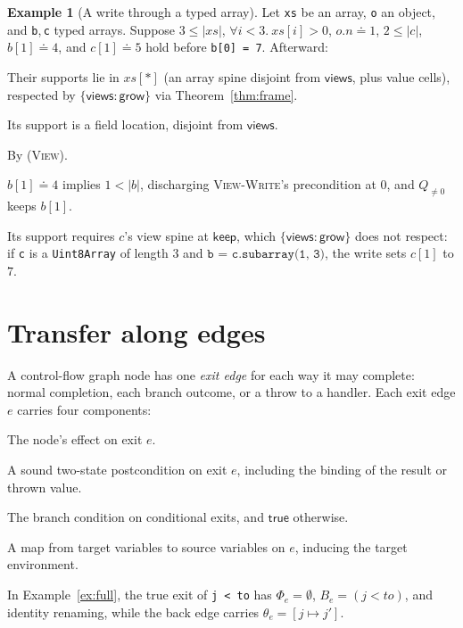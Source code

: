 \documentclass[10pt,a4paper]{article}
\theoremstyle{definition}
\newtheorem{example}[theorem]{Example}
\theoremstyle{remark}
\newcommand{\kw}[1]{\mathsf{#1}}
\newcommand{\keep}{\kw{keep}}
\newcommand{\grow}{\kw{grow}}
\newcommand{\vw}{\kw{views}}
\newcommand{\len}[1]{|#1|}
\newcommand{\code}[1]{\texttt{#1}}
\begin{document}
\begin{example}[A write through a typed array]\label{ex:view}
Let \code{xs} be an array, \code{o} an object, and \code{b},\,\code{c}
typed arrays. Suppose $3\le\len{\mathit{xs}}$,
$\forall i<3.\ \mathit{xs}[i]>0$, $o.n\doteq 1$, $2\le\len c$,
$b[1]\doteq 4$, and $c[1]\doteq 5$ hold before \code{b[0] = 7}. Afterward:
\begin{description}[leftmargin=1.5em,style=nextline]
\item[{$3\le\len{\mathit{xs}}$ and $\forall i<3.\ \mathit{xs}[i]>0$ hold}]
Their supports lie in $\mathit{xs}[\ast]$ (an array spine disjoint from
$\vw$, plus value cells), respected by $\{\vw:\grow\}$ via
Theorem~\ref{thm:frame}.
\item[$o.n\doteq 1$ holds] Its support is a field location, disjoint from $\vw$.
\item[$2\le\len c$ holds] By \textsc{(View)}.
\item[{$b[1]\doteq 4$ holds}] $b[1]\doteq 4$ implies $1<\len b$,
discharging \textsc{View-Write}'s precondition at $0$, and $Q_{\ne 0}$
keeps $b[1]$.
\item[{$c[1]\doteq 5$ may fail}] Its support requires $c$'s view spine at
$\keep$, which $\{\vw:\grow\}$ does not respect: if \code{c} is a
\code{Uint8Array} of length $3$ and $\code{b = c.subarray(1, 3)}$, the
write sets $c[1]$ to $7$.
\end{description}
\end{example}

\section{Transfer along edges}\label{sec:transfer}

A control-flow graph node has one \emph{exit edge} for each way it may
complete: normal completion, each branch outcome, or a throw to a
handler. Each exit edge $e$ carries four components:
\begin{description}[leftmargin=1.5em,style=nextline]
\item[Effect $\Phi_e$] The node's effect on exit $e$.
\item[Postcondition $Q_e$] A sound two-state postcondition on exit $e$,
including the binding of the result or thrown value.
\item[Condition $B_e$] The branch condition on conditional exits, and
$\kw{true}$ otherwise.
\item[Renaming $\theta_e$] A map from target variables to source
variables on $e$, inducing the target environment.
\end{description}
\noindent
In Example~\ref{ex:full}, the true exit of \code{j < to} has
$\Phi_e=\emptyset$, $B_e=(j<\mathit{to})$, and identity renaming, while
the back edge carries $\theta_e=[j\mapsto j']$.
\end{document}
